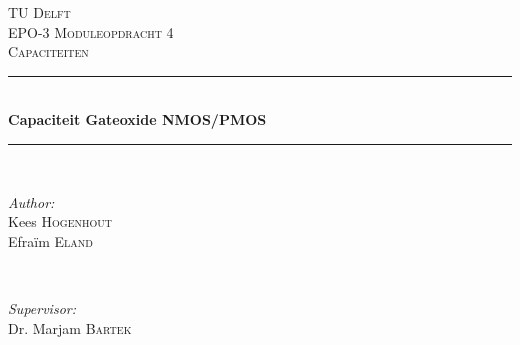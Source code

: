\begin{titlepage}

\newcommand{\HRule}{\rule{\linewidth}{0.5mm}} %

\center %
 

\textsc{\LARGE TU Delft}\\[1.5cm] %
\textsc{\Large EPO-3 Moduleopdracht 4}\\[0.5cm] %
\textsc{\large Capaciteiten}\\[0.5cm] %


\HRule \\[0.4cm]
{ \huge \bfseries Capaciteit Gateoxide NMOS/PMOS}\\[0.4cm] %
\HRule \\[1.5cm]
 

\begin{minipage}{0.4\textwidth}
\begin{flushleft} \large
\emph{Author:}\\
Kees \textsc{Hogenhout}\\ %
Efraïm \textsc{Eland} %
\end{flushleft}
\end{minipage}
~
\begin{minipage}{0.4\textwidth}
\begin{flushright} \large
\emph{Supervisor:} \\
Dr. Marjam \textsc{Bartek} %
\end{flushright}
\end{minipage}\\[4cm]



\end{titlepage}

